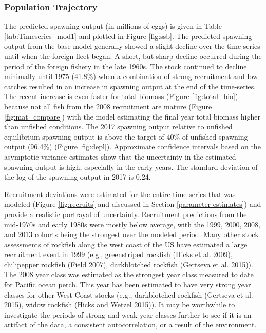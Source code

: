 \documentclass[12pt,]{article}
\begin{document}
\subsubsection{Population Trajectory}\label{population-trajectory}

The predicted spawning output (in millions of eggs) is given in Table
\ref{tab:Timeseries_mod1} and plotted in Figure \ref{fig:ssb}. The
predicted spawning output from the base model generally showed a slight
decline over the time-series until when the foreign fleet began. A
short, but sharp decline occurred during the period of the foreign
fishery in the late 1960s. The stock continued to decline minimally
until 1975 (41.8\%) when a combination of strong recruitment and low
catches resulted in an increase in spawning output at the end of the
time-series. The recent increase is even faster for total biomass
(Figure \ref{fig:total_bio}) because not all fish from the 2008
recruitment are mature (Figure \ref{fig:mat_compare}) with the model
estimating the final year total biomass higher than unfished conditions.
The 2017 spawning output relative to unfished equilibrium spawning
output is above the target of 40\% of unfished spawning output (96.4\%)
(Figure \ref{fig:depl}). Approximate confidence intervals based on the
asymptotic variance estimates show that the uncertainty in the estimated
spawning output is high, especially in the early years. The standard
deviation of the log of the spawning output in 2017 is 0.24.

Recruitment deviations were estimated for the entire time-series that
was modeled (Figure \ref{fig:recruits} and discussed in Section
\ref{parameter-estimates}) and provide a realistic portrayal of
uncertainty. Recruitment predictions from the mid-1970s and early 1980s
were mostly below average, with the 1999, 2000, 2008, and 2013 cohorts
being the strongest over the modeled period. Many other stock
assessments of rockfish along the west coast of the US have estimated a
large recruitment event in 1999 (e.g., greenstriped rockfish (Hicks et
al. \protect\hyperlink{ref-hicks_status_2009}{2009}), chilipepper
rockfish (Field \protect\hyperlink{ref-field_status_2007}{2007}),
darkblotched rockfish (Gertseva et al.
\protect\hyperlink{ref-gertseva_status_2015}{2015})). The 2008 year
class was estimated as the strongest year class measured to date for
Pacific ocean perch. This year has been estimated to have very strong
year classes for other West Coast stocks (e.g., darkblotched rockfish
(Gertseva et al. \protect\hyperlink{ref-gertseva_status_2015}{2015}),
widow rockfish (Hicks and Wetzel
\protect\hyperlink{ref-hicks_status_2015}{2015})). It may be worthwhile
to investigate the periods of strong and weak year classes further to
see if it is an artifact of the data, a consistent autocorrelation, or a
result of the environment.
\end{document}
